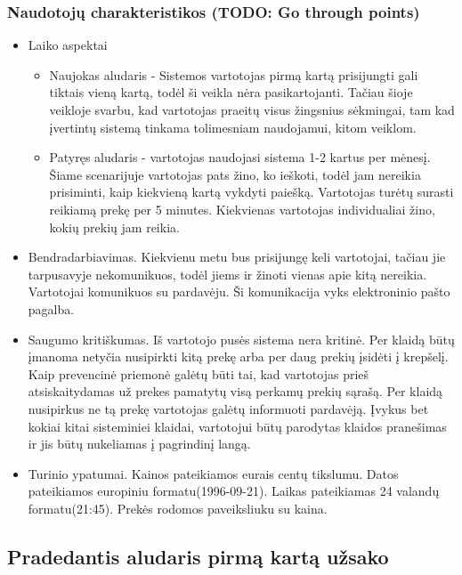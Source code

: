 \documentclass[oneside]{VUMIFPSkursinis}
\begin{document}
		\subsubsection{Naudotojų charakteristikos (TODO: Go through points)}
			\begin{itemize}
				\item{Laiko aspektai}
					\begin{itemize}
						\item{
							Naujokas aludaris - Sistemos vartotojas pirmą kartą prisijungti gali tiktais vieną kartą, todėl ši veikla nėra pasikartojanti.
							Tačiau šioje veikloje svarbu, kad vartotojas praeitų visus žingsnius sėkmingai, tam kad įvertintų sistemą tinkama tolimesniam naudojamui, kitom veiklom.
						}
						\item{
							Patyręs aludaris - vartotojas naudojasi sistema 1-2 kartus per mėnesį.
							Šiame scenarijuje vartotojas pats žino, ko ieškoti, todėl jam nereikia prisiminti, kaip kiekvieną kartą vykdyti paiešką.
							Vartotojas turėtų surasti reikiamą prekę per 5 minutes.
							Kiekvienas vartotojas individualiai žino, kokių prekių jam reikia.
						}
					\end{itemize}
				\item{Bendradarbiavimas.}
					Kiekvienu metu bus prisijungę keli vartotojai, tačiau jie tarpusavyje nekomunikuos, todėl jiems ir žinoti vienas apie kitą nereikia.
					Vartotojai komunikuos su pardavėju.
					Ši komunikacija vyks elektroninio pašto pagalba.
				\item{Saugumo kritiškumas.}
					Iš vartotojo pusės sistema nera kritinė.
					Per klaidą būtų įmanoma netyčia nusipirkti kitą prekę arba per daug prekių įsidėti į krepšelį.
					Kaip prevencinė priemonė galėtų būti tai, kad vartotojas prieš atsiskaitydamas už prekes pamatytų visą perkamų prekių sąrašą.
					Per klaidą nusipirkus ne tą prekę vartotojas galėtų informuoti pardavėją.
					Įvykus bet kokiai kitai sisteminiei klaidai, vartotojui būtų parodytas klaidos pranešimas ir jis būtų nukeliamas į pagrindinį langą.
				\item{Turinio ypatumai.}
					Kainos pateikiamos eurais centų tikslumu.
					Datos pateikiamos europiniu formatu(1996-09-21).
					Laikas pateikiamas 24 valandų formatu(21:45).
					Prekės rodomos paveiksliuku su kaina.
			\end{itemize}
	\subsection{Pradedantis aludaris pirmą kartą užsako}
\end{document}
